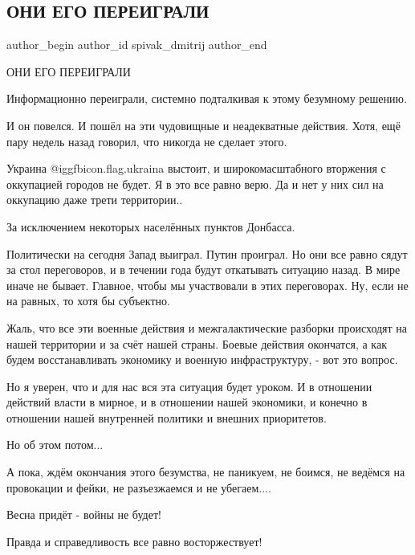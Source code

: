  
 
 
 
 
 
\subsection{ОНИ ЕГО ПЕРЕИГРАЛИ}
\label{sec:24_02_2022.fb.spivak_dmitrij.1.oni_ego_pereigrali}
 
\ifcmt
 author_begin
   author_id spivak_dmitrij
 author_end
\fi

ОНИ ЕГО ПЕРЕИГРАЛИ

Информационно переиграли, системно подталкивая к этому безумному решению. 

И он повелся. И пошёл на эти чудовищные и неадекватные действия. Хотя, ещё пару
недель назад говорил, что никогда не сделает этого. 

Украина @igg{fbicon.flag.ukraina} выстоит, и широкомасштабного вторжения с
оккупацией городов не будет. Я в это все равно верю. Да и нет у них сил на
оккупацию даже трети территории.. 

За исключением некоторых населённых пунктов Донбасса. 

Политически на сегодня Запад выиграл. Путин проиграл. Но они все равно сядут за
стол переговоров,  и в течении года будут откатывать ситуацию назад. В мире
иначе не бывает. Главное, чтобы мы участвовали в этих переговорах. Ну, если не
на равных, то хотя бы субъектно. 

Жаль, что все эти военные действия и межгалактические разборки происходят на
нашей территории и за счёт нашей страны. Боевые действия окончатся, а как будем
восстанавливать экономику и военную инфраструктуру, - вот это вопрос. 

Но я уверен, что и для нас вся эта ситуация будет уроком. И в отношении
действий  власти в мирное, и в отношении нашей экономики, и конечно в отношении
нашей внутренней  политики и внешних приоритетов. 

Но об этом потом...

А пока, ждём окончания этого безумства, не паникуем, не боимся, не ведёмся на
провокации и фейки, не разъезжаемся и не убегаем.... 

Весна придёт - войны не будет! 

Правда и справедливость все равно восторжествует!
